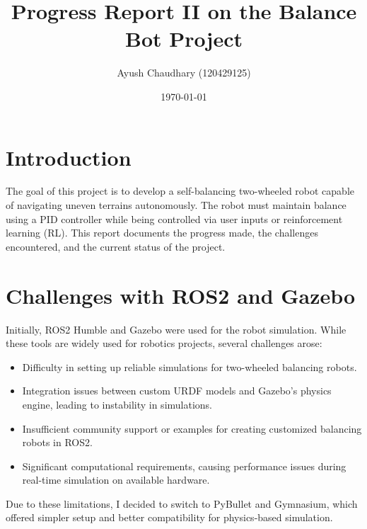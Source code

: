 \documentclass[12pt]{article}
\title{Progress Report II on the Balance Bot Project}
\author{Ayush Chaudhary (120429125)}
\date{\today}
\begin{document}
\maketitle

\section*{Introduction}
The goal of this project is to develop a self-balancing two-wheeled robot capable of navigating uneven terrains autonomously. The robot must maintain balance using a PID controller while being controlled via user inputs or reinforcement learning (RL). This report documents the progress made, the challenges encountered, and the current status of the project.

\section*{Challenges with ROS2 and Gazebo}
Initially, ROS2 Humble and Gazebo were used for the robot simulation. While these tools are widely used for robotics projects, several challenges arose:
\begin{itemize}
    \item Difficulty in setting up reliable simulations for two-wheeled balancing robots.
    \item Integration issues between custom URDF models and Gazebo's physics engine, leading to instability in simulations.
    \item Insufficient community support or examples for creating customized balancing robots in ROS2.
    \item Significant computational requirements, causing performance issues during real-time simulation on available hardware.
\end{itemize}
Due to these limitations, I decided to switch to PyBullet and Gymnasium, which offered simpler setup and better compatibility for physics-based simulation.
\end{document}
